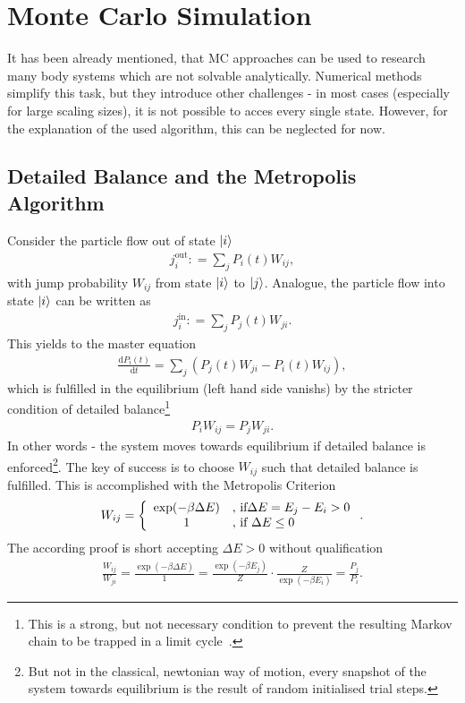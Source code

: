 \section{Monte Carlo Simulation}
It has been already mentioned, that MC approaches can be used to research many body systems which are not solvable analytically.
Numerical methods simplify this task, but they introduce other challenges - in most cases (especially for large scaling sizes), it is not possible to acces every single state.
However, for the explanation of the used algorithm, this can be neglected for now.

\subsection{Detailed Balance and the Metropolis Algorithm}
Consider the particle flow out of state $\ket{i}$
\begin{align}
	j^\text{out}_{i} \mathrel{\mathop:}= \sum_j P_i(t) W_{ij},
\end{align}
with jump probability $W_{ij}$ from state $\ket{i}$ to $\ket{j}$.
Analogue, the particle flow into state $\ket{i}$ can be written as
\begin{align}
	j^\text{in}_{i} \mathrel{\mathop:}= \sum_j P_j(t) W_{ji}.
\end{align}
This yields to the master equation
\begin{align}
	\frac{\mathrm{d}P_i(t)}{\mathrm{d}t} = 
		\sum_{j}\left(P_j(t)W_{ji} - P_i(t)W_{ij}\right),
\end{align}
which is fulfilled in the equilibrium (left hand side vanishs) by the stricter condition of detailed balance\footnote{This is a strong, but not necessary condition to prevent the resulting Markov chain to be trapped in a limit cycle~\cite{newman1999monte}.}
\begin{align}
	P_iW_{ij} = P_jW_{ji}.
\end{align}
In other words - the system moves towards equilibrium if detailed balance is enforced\footnote{But not in the classical, newtonian way of motion, every snapshot of the system towards equilibrium is the result of random initialised trial steps.}.
The key of success is to choose $W_{ij}$ such that detailed balance is fulfilled.
This is accomplished with the Metropolis Criterion
\begin{align}
	W_{ij} = \left\{
		\begin{array}{c l}
			\exp(-\beta\Delta E)&\text{, if}\Delta E = E_j - E_i > 0\\
			1										&\text{, if }\Delta E \leq 0 
		\end{array}\right..
\end{align}
The according proof is short accepting $\Delta E > 0$ without qualification
\begin{align} 
	\frac{W_{ij}}{W_{ji}} = \frac{\exp\left(-\beta\Delta E\right)}{1} = \frac{\exp(-\beta E_j)}{Z}\cdot\frac{Z}{\exp(-\beta E_i)} = \frac{P_j}{P_i}.
\end{align}

